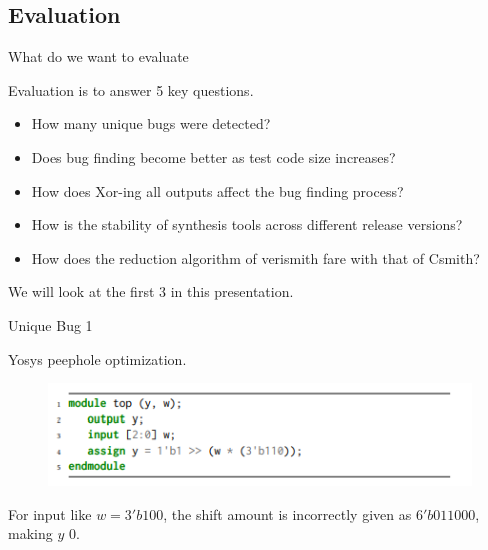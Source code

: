 \documentclass[xcolor=dvipsnames]{beamer}
\begin{document}
    \subsection{Evaluation}
    \begin{frame}{What do we want to evaluate}
        
        Evaluation is to answer 5 key questions.
        \begin{itemize}
            \item How many unique bugs were detected?
            \item Does bug finding become better as test code size increases?
            \item How does Xor-ing all outputs affect the bug finding process?
            \item How is the stability of synthesis tools across different release versions? 
            \item How does the reduction algorithm of verismith fare with that of Csmith?
        \end{itemize}

        We will look at the first 3 in this presentation.

    \end{frame}


    \begin{frame}{Unique Bug 1}
        
        Yosys peephole optimization.
        \begin{figure}
            \includegraphics[scale=0.8]{Yosys_Peephole.PNG}
        \end{figure}

        For input like $w=3'b100$, the shift amount is incorrectly given as $6'b011000$, making $y$ $0$.

    \end{frame}

\end{document}
